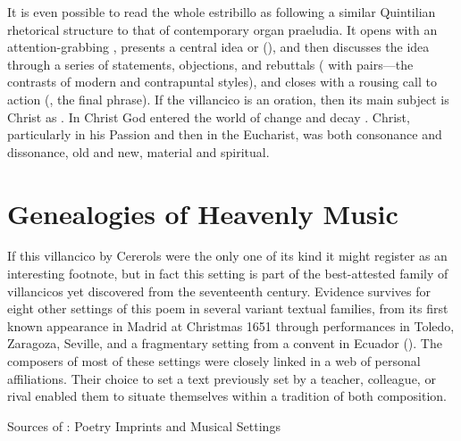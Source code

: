 It is even possible to read the whole estribillo as following a similar
Quintilian rhetorical structure to that of contemporary organ praeludia.%
    \Autocite{Jacobson:BuxtehudeRhetoric}
It opens with an attention-grabbing , presents a central idea or
 (), and then discusses the
idea through a series of statements, objections, and rebuttals (
with  pairs---the contrasts of modern and
contrapuntal styles), and closes with a rousing call to action
(, the final phrase).
If the villancico is an oration, then its main subject is Christ as .
In Christ God entered the world of change and decay .
Christ, particularly in his Passion and then in the Eucharist, was both
consonance and dissonance, old and new, material and spiritual.

\section{Genealogies of Heavenly Music}

If this villancico by Cererols were the only one of its kind it might register
as an interesting footnote, but in fact this setting is part of the
best-attested family of villancicos yet discovered from the seventeenth century.
Evidence survives for eight other settings of this poem in several variant
textual families, from its first known appearance in Madrid at Christmas 1651
through performances in Toledo, Zaragoza, Seville, and a fragmentary setting
from a convent in Ecuador ().
The composers of most of these settings were closely linked in a web of personal
affiliations.
Their choice to set a text previously set by a teacher, colleague, or rival
enabled them to situate themselves within a tradition of both composition.

{Sources of : Poetry Imprints and
Musical Settings}

